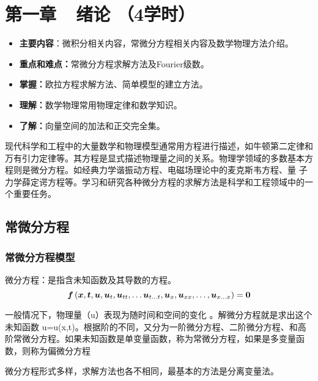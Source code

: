 \renewcommand{\thechapter}{}
\chapter{第一章~~绪论 （4学时）}
\renewcommand{\thechapter}{1}
\begin{itemize}
\item \textbf{主要内容}：微积分相关内容，常微分方程相关内容及数学物理方法介绍。
\item \textbf{重点和难点：}常微分方程求解方法及Fourier级数。
\item \textbf{掌握：}欧拉方程求解方法、简单模型的建立方法。
\item \textbf{理解：}数学物理常用物理定律和数学知识。
\item \textbf{了解：}向量空间的加法和正交完全集。
\end{itemize}

现代科学和工程中的大量数学和物理模型通常用方程进行描述，如牛顿第二定律和万有引力定律等。其方程是显式描述物理量之间的关系。物理学领域的多数基本方程则是微分方程。如经典力学谐振动方程、电磁场理论中的麦克斯韦方程、量 子力学薛定谔方程等。学习和研究各种微分方程的求解方法是科学和工程领域中的一个重要任务。

\section{常微分方程}
\subsection{常微分方程模型}

\begin{definition}[]  
微分方程：是指含未知函数及其导数的方程。
	\begin{equation}
   \boldsymbol{f}\left(\boldsymbol{x}, \boldsymbol{t}, \boldsymbol{u}, \boldsymbol{u}_{t}, \boldsymbol{u}_{t t}, \ldots \boldsymbol{u}_{t \ldots t}, \boldsymbol{u}_{x}, \boldsymbol{u}_{x x}, \ldots, \boldsymbol{u}_{x \ldots x}\right)=\mathbf{0} \\
	\end{equation}
\end{definition}
一般情况下，物理量（u）表现为随时间和空间的变化 。解微分方程就是求出这个未知函数 u=u(x,t)。根据阶的不同，又分为一阶微分方程、二阶微分方程、和高阶常微分方程。如果未知函数是单变量函数，称为常微分方程，如果是多变量函数，则称为偏微分方程 
\begin{remark}
微分方程形式多样，求解方法也各不相同，最基本的方法是分离变量法。
\end{remark}

